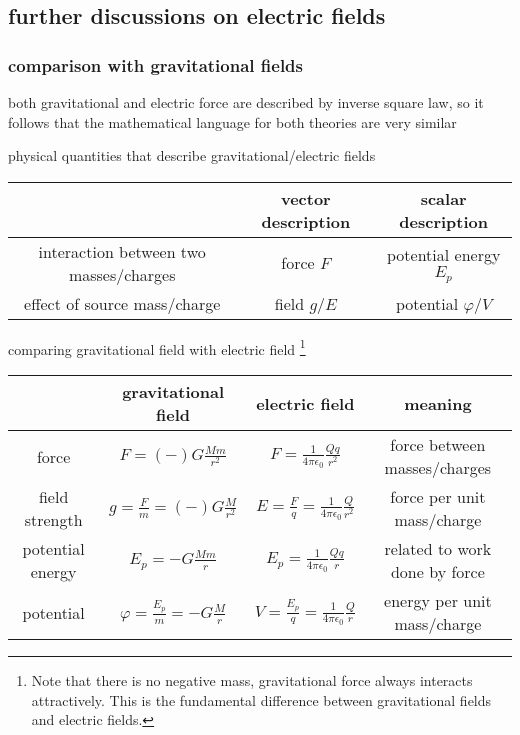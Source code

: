 \subsection{further discussions on electric fields}

\subsubsection{comparison with gravitational fields}

both gravitational and electric force are described by inverse square law, so it follows that the mathematical language for both theories are very similar

\cmt physical quantities that describe gravitational/electric fields

\begin{center}
	\begin{tabular}{|c|c|c|}
		\hline
		& vector description & scalar description \\ \hline 
		interaction between two masses/charges & force $F$ & potential energy $E_p$ \\ \hline
		effect of source mass/charge & field $g$/$E$ & potential $\varphi$/$V$ \\ \hline
	\end{tabular}
\end{center}

\cmt comparing gravitational field with electric field
\footnote{Note that there is no negative mass, gravitational force always interacts attractively. This is the fundamental difference between gravitational fields and electric fields.}

\begin{center}
{\renewcommand{\arraystretch}{1.28}
\begin{tabular}{|c|c|c|c|}
\hline
& gravitational field & electric field & meaning \\ \hline 
force & $F=(-)G \frac{Mm}{r^2}$ & $F=\frac{1}{4\pi\epsilon_0} \frac{Qq}{r^2}$ & force between masses/charges\\ [1ex] \hline
field strength & $g= \frac{F}{m} = (-)G \frac{M}{r^2}$ & $E= \frac{F}{q} = \frac{1}{4\pi\epsilon_0} \frac{Q}{r^2}$ & force per unit mass/charge\\ [1ex] \hline
potential energy &  $E_p = -G \frac{Mm}{r}$ & $E_p=\frac{1}{4\pi\epsilon_0} \frac{Qq}{r}$ & related to work done by force \\ [1ex] \hline
potential & $\varphi = \frac{E_p}{m} = -G \frac{M}{r}$ & $V = \frac{E_p}{q} = \frac{1}{4\pi\epsilon_0} \frac{Q}{r}$ & energy per unit mass/charge\\ [1ex] \hline
\end{tabular}}
\end{center}

